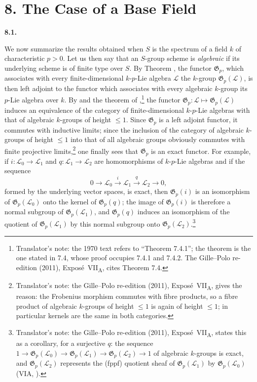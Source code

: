 
\section*{8. The Case of a Base Field}
\label{sga3:VIIA:8}

\medskip
\noindent\textbf{8.1.}
\label{sga3:VIIA:8.1}

We now summarize the results obtained when \(S\) is the spectrum of a
field \(k\) of characteristic \(p>0\). Let us then say that an
\(S\)-group scheme is \emph{algebraic} if its underlying scheme is of
finite type over \(S\). By Theorem , the functor \(\mathfrak G_p\), which
associates with every finite-dimensional \(k\)-\(p\)-Lie algebra
\(\mathcal L\) the \(k\)-group \(\mathfrak G_p(\mathcal L)\), is then left
adjoint to the functor which associates with every algebraic \(k\)-group
its \(p\)-Lie algebra over \(k\). By  and the theorem of ,\footnote{Translator's note: the
1970 text refers to ``Theorem 7.4.1''; the theorem is the one stated in
7.4, whose proof occupies 7.4.1 and 7.4.2. The Gille--Polo re-edition
(2011), Expos\'e~VII\textsubscript{A}, cites Theorem 7.4.} the functor
\(\mathfrak G_p:\mathcal L\mapsto\mathfrak G_p(\mathcal L)\) induces an
equivalence of the category of finite-dimensional \(k\)-\(p\)-Lie algebras
with that of algebraic \(k\)-groups of height \(\leq1\). Since
\(\mathfrak G_p\) is a left adjoint functor, it commutes with inductive
limits; since the inclusion of the category of algebraic \(k\)-groups of
height \(\leq1\) into that of all algebraic groups obviously commutes with
finite projective limits,\footnote{Translator's note: the Gille--Polo
re-edition (2011), Expos\'e~VII\textsubscript{A}, gives the reason: the
Frobenius morphism commutes with fibre products, so a fibre product of
algebraic \(k\)-groups of height \(\leq1\) is again of height \(\leq1\);
in particular kernels are the same in both categories.} one finally sees that \(\mathfrak G_p\) is an
exact functor. For example, if \(i:\mathcal L_0\to\mathcal L_1\) and
\(q:\mathcal L_1\to\mathcal L_2\) are homomorphisms of \(k\)-\(p\)-Lie
algebras and if the sequence
\[
  0\longrightarrow\mathcal L_0\xrightarrow{i}\mathcal L_1
  \xrightarrow{q}\mathcal L_2\longrightarrow0,
\]
formed by the underlying vector spaces, is exact, then
\(\mathfrak G_p(i)\) is an isomorphism of \(\mathfrak G_p(\mathcal L_0)\)
onto the kernel of \(\mathfrak G_p(q)\); the image of
\(\mathfrak G_p(i)\) is therefore a normal subgroup of
\(\mathfrak G_p(\mathcal L_1)\), and \(\mathfrak G_p(q)\) induces an
isomorphism of the quotient of \(\mathfrak G_p(\mathcal L_1)\) by this
normal subgroup onto \(\mathfrak G_p(\mathcal L_2)\).\footnote{Translator's
note: the Gille--Polo re-edition (2011), Expos\'e~VII\textsubscript{A},
states this as a corollary, for a surjective \(q\): the sequence
\(1\to\mathfrak G_p(\mathcal L_0)\to\mathfrak G_p(\mathcal L_1)\to
\mathfrak G_p(\mathcal L_2)\to1\) of algebraic \(k\)-groups is exact, and
\(\mathfrak G_p(\mathcal L_2)\) represents the (fppf) quotient sheaf of
\(\mathfrak G_p(\mathcal L_1)\) by \(\mathfrak G_p(\mathcal L_0)\) (VIA,
).}

